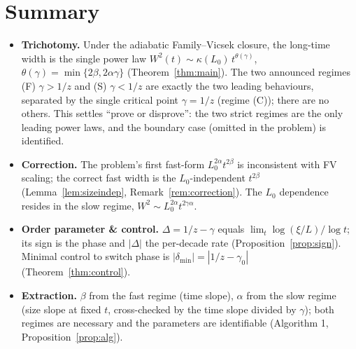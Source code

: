 \documentclass{amsart}
\theoremstyle{definition}
\newcommand{\asymp}{\sim}
\begin{document}
\section{Summary}

\begin{itemize}
\item \textbf{Trichotomy.} Under the adiabatic Family--Vicsek closure, the
  long-time width is the single power law $W^2(t)\asymp\kappa(L_0)\,t^{\theta(\gamma)}$,
  $\theta(\gamma)=\min\{2\beta,2\alpha\gamma\}$ (Theorem~\ref{thm:main}). The two
  announced regimes (F) $\gamma>1/z$ and (S) $\gamma<1/z$ are exactly the two
  leading behaviours, separated by the single critical point $\gamma=1/z$ (regime
  (C)); there are no others. This settles ``prove or disprove'': the two strict
  regimes are the only leading power laws, and the boundary case (omitted in the
  problem) is identified.
\item \textbf{Correction.} The problem's first fast-form $L_0^{2\alpha}t^{2\beta}$
  is inconsistent with FV scaling; the correct fast width is the $L_0$-independent
  $t^{2\beta}$ (Lemma~\ref{lem:sizeindep}, Remark~\ref{rem:correction}). The $L_0$
  dependence resides in the slow regime, $W^2\asymp L_0^{2\alpha}t^{2\gamma\alpha}$.
\item \textbf{Order parameter \& control.} $\Delta=1/z-\gamma$ equals
  $\lim_t\log(\xi/L)/\log t$; its sign is the phase and $|\Delta|$ the per-decade
  rate (Proposition~\ref{prop:sign}). Minimal control to switch phase is
  $|\delta_{\min}|=|1/z-\gamma_0|$ (Theorem~\ref{thm:control}).
\item \textbf{Extraction.} $\beta$ from the fast regime (time slope), $\alpha$ from
  the slow regime (size slope at fixed $t$, cross-checked by the time slope divided
  by $\gamma$); both regimes are necessary and the parameters are identifiable
  (Algorithm 1, Proposition~\ref{prop:alg}).
\end{itemize}
\end{document}
